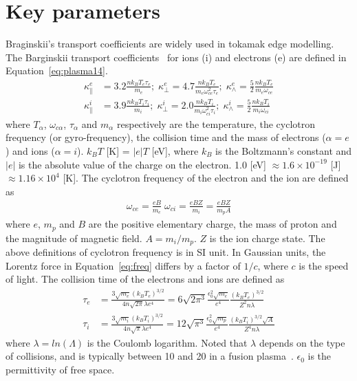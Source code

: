 \documentclass[runningheads]{llncs}
\begin{document}
\section{Key parameters}
Braginskii's transport coefficients are widely used in tokamak edge modelling. The Barginskii transport coefficients~\cite{braginskii1965transport,morsenuclear,richardson20192019} for ions (i) and electrons (e) are defined in Equation~\eqref{eq:plasma14}.
\begin{subequations} \label{eq:plasma14}
	\begin{align}
	\kappa^e_{\parallel} &= 3.2\frac{n k_B T_e \tau_e}{m_e}; \; \kappa^e_{\perp} = 4.7 \frac{n k_B T_e}{m_e \omega^2_{ce} \tau_e};\; \kappa^e_{\wedge} = \frac{5}{2}\frac{n k_B T_e }{m_e \omega_{ce}}\\
	\kappa^i_{\parallel} &= 3.9\frac{n k_B T_i \tau_i}{m_i}; \; \kappa^i_{\perp} = 2.0 \frac{n k_B T_i}{m_i \omega^2_{ci} \tau_i};\; \kappa^i_{\wedge} = \frac{5}{2}\frac{n k_B T_i}{m_i \omega_{ci}}
	\end{align}
\end{subequations}  
where $T_{\alpha}$, $\omega_{c\alpha}$, $\tau_{\alpha}$ and $m_{\alpha}$ respectively are the temperature, the cyclotron frequency (or gyro-frequency), the collision time and the mass of electrons ($\alpha=e$) and ions ($\alpha=i$). $k_B T$ [K] = $|e|T$ [eV], where $k_B$ is the Boltzmann's constant and $|e|$ is the absolute value of the charge on the electron. 1.0 [eV] $\approx 1.6 \times 10^{-19}$ [J] $\approx 1.16 \times 10^{4}$ [K]. The cyclotron frequency of the electron and the ion are defined as 
\begin{eqnarray} \label{eq:plasma15}
\omega_{c e} = \frac{e B}{m_e}\; \omega_{ci} = \frac{e B Z}{m_i} = \frac{e B Z}{m_p A}\label{eq:freq}
\end{eqnarray}
where $e$, $m_p$ and $B$ are the positive elementary charge, the mass of proton and the magnitude of magnetic field. $A = m_i/m_p$. $Z$ is the ion charge state. The above definitions of cyclotron frequency is in SI unit. In Gaussian units, the Lorentz force in Equation~\eqref{eq:freq} differs by a factor of $1/c$, where $c$ is the speed of light. The collision time of the electrons and ions are defined as
\begin{subequations} \label{eq:plasma16}
	\begin{align}
	\tau_e &= \frac{3\sqrt{m_e}(k_B T_e)^{3/2}}{4 n \sqrt{2\pi} \lambda e^4} = 6\sqrt{2\pi^3} \frac{\epsilon^2_0 \sqrt{m_e}}{e^4} \frac{(k_B T_e)^{3/2}}{Z^2 n \lambda} \\
	\tau_i &= \frac{3\sqrt{m_i}(k_B T_i)^{3/2}}{4 n \sqrt{\pi}\lambda e^4} = 12\sqrt{\pi^3} \frac{\epsilon^2_0 \sqrt{m_p}}{e^4} \frac{(k_B T_i)^{3/2} \sqrt{A}}{Z^4 n \lambda}
	\end{align}
\end{subequations}
where $\lambda = ln(\Lambda)$ is the Coulomb logarithm. Noted that $\lambda$ depends on the type of collisions, and is typically between 10 and 20 in a fusion plasma~\cite{spatschek2013high}. $\epsilon_0$ is the permittivity of free space.
\end{document}
